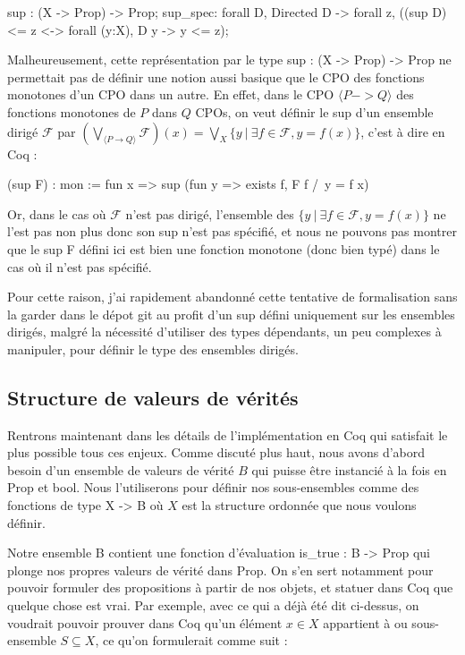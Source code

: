 \documentclass{article}
\newcommand\code[1]{{\fontfamily{lmtt}\selectfont #1}}
\theoremstyle{definition}
\begin{document}
\begin{coq}
sup : (X -> Prop) -> Prop;
sup_spec: forall D, Directed D -> forall z, 
			 ((sup D) <= z <-> forall (y:X), D y -> y <= z);
\end{coq}

Malheureusement, cette représentation par le type \code{sup : (X -> Prop) -> Prop} ne permettait pas de définir une notion aussi basique que le CPO des fonctions monotones d'un CPO dans un autre. En effet, dans le CPO $\langle P -> Q \rangle$ des fonctions monotones de $P$ dans $Q$ CPOs, on veut définir le sup d'un ensemble dirigé $\mathcal{F}$ par $(\bigvee_{\langle P \rightarrow Q \rangle} \mathcal{F})(x) = \bigvee_{X} \{y ~ | ~ \exists f \in \mathcal{F}, y = f(x)\}$, c'est à dire en Coq :

\begin{coq}
(sup F) : mon := fun x => sup (fun y => exists f, F f /\ y = f x)
\end{coq}

Or, dans le cas où $\mathcal{F}$ n'est pas dirigé, l'ensemble des $\{y ~ | ~ \exists f \in \mathcal{F}, y = f(x)\}$ ne l'est pas non plus donc son sup n'est pas spécifié, et nous ne pouvons pas montrer que le \code{sup F} défini ici est bien une fonction monotone (donc bien typé) dans le cas où il n'est pas spécifié.

Pour cette raison, j'ai rapidement abandonné cette tentative de formalisation sans la garder dans le dépot git au profit d'un sup défini uniquement sur les ensembles dirigés, malgré la nécessité d'utiliser des types dépendants, un peu complexes à manipuler, pour définir le type des ensembles dirigés.


\subsection{Structure de valeurs de vérités}

Rentrons maintenant dans les détails de l'implémentation en Coq qui satisfait le plus possible tous ces enjeux. Comme discuté plus haut, nous avons d'abord besoin d'un ensemble de valeurs de vérité $B$ qui puisse être instancié à la fois en \code{Prop} et \code{bool}. Nous l'utiliserons pour définir nos sous-ensembles comme des fonctions de type \code{X -> B} où $X$ est la structure ordonnée que nous voulons définir.

Notre ensemble B contient une fonction d'évaluation \code{is\_true : B -> Prop} qui plonge nos propres valeurs de vérité dans \code{Prop}. On s'en sert notamment pour pouvoir formuler des propositions à partir de nos objets, et statuer dans Coq que quelque chose est vrai. Par exemple, avec ce qui a déjà été dit ci-dessus, on voudrait pouvoir prouver dans Coq qu'un élément $x \in X$ appartient à ou sous-ensemble $S \subseteq X$, ce qu'on formulerait comme suit :
\end{document}
